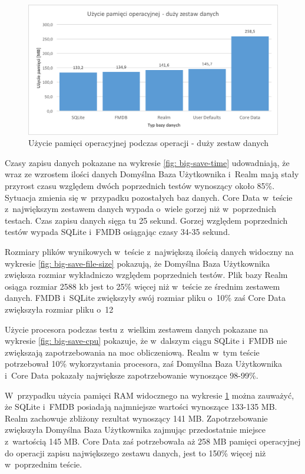\begin{figure}[H]
\centering
	\includegraphics[width=15cm]{img/save_data/save_ram_big.png}
	\caption{Użycie pamięci operacyjnej podczas operacji - duży zestaw danych}
	\label{fig: big-save-ram}
\end{figure}

\newpage

Czasy zapisu danych pokazane na wykresie \ref{fig: big-save-time} udowadniają, że wraz ze wzrostem ilości danych Domyślna Baza Użytkownika i~Realm mają stały przyrost czasu względem dwóch poprzednich testów wynoszący około 85\%. Sytuacja zmienia się w~przypadku pozostałych baz danych. Core Data w~teście z~największym zestawem danych wypada o~wiele gorzej niż w~poprzednich testach. Czas zapisu danych sięga tu 25 sekund. Gorzej względem poprzednich testów wypada SQLite i~FMDB osiągając czasy 34-35 sekund. 

Rozmiary plików wynikowych w~teście z~największą ilością danych widoczny na wykresie \ref{fig: big-save-file-size} pokazują, że Domyślna Baza Użytkownika zwiększa rozmiar wykładniczo względem poprzednich testów. Plik bazy Realm osiąga rozmiar 2588 kb jest to 25\% więcej niż w~teście ze średnim zestawem danych. FMDB i~SQLite zwiększyły swój rozmiar pliku o~10\% zaś Core Data zwiększyła rozmiar pliku o~12%

Użycie procesora podczas testu z~wielkim zestawem danych pokazane na wykresie \ref{fig: big-save-cpu} pokazuje, że w~dalszym ciągu SQLite i~FMDB nie zwiększają zapotrzebowania na moc obliczeniową. Realm w~tym teście potrzebował 10\% wykorzystania procesora, zaś Domyślna Baza Użytkownika i~Core Data pokazały największe zapotrzebowanie wynoszące 98-99\%. 

 W~przypadku użycia pamięci RAM widocznego na wykresie \ref{fig: big-save-ram} można zauważyć, że SQLite i~FMDB posiadają najmniejsze wartości wynoszące 133-135 MB. Realm zachowuje zbliżony rezultat wynoszący 141 MB. Zapotrzebowanie zwiększyła Domyślna Baza Użytkownika zajmując przedostatnie miejsce z~wartością 145 MB. Core Data zaś potrzebowała aż 258 MB pamięci operacyjnej do operacji zapisu największego zestawu danych, jest to 150\% więcej niż w~poprzednim teście. 

